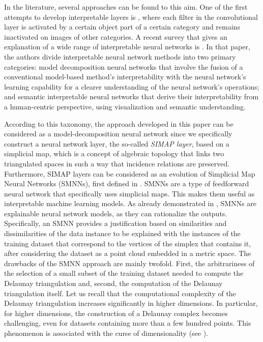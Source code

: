 In the literature, several approaches can be found to this aim.
One of the first attempts to develop interpretable layers is \cite{Zhang_2018_CVPR}, where each filter in the convolutional layer is activated by a certain object part of a certain category and remains inactivated on images of other categories. A recent survey that gives an explanation of a wide range of interpretable neural networks is
\cite{Liu2023InterpretableNN}.
In that paper, the authors divide interpretable neural network methods into two primary categories: model decomposition neural networks that involve the fusion of a conventional model-based method's interpretability with the neural network's learning capability for a clearer understanding of the neural network's operations; and semantic interpretable neural networks that derive their interpretability from a human-centric perspective, using visualization and semantic understanding.

According to this taxonomy, the approach developed in this paper can be considered as a model-decomposition neural network since we specifically construct a neural network layer, the so-called {\it SIMAP layer},  based on a simplicial map, which is a concept of algebraic topology that links two triangulated spaces in such a way that incidence relations are preserved.
Furthermore, SIMAP layers can be considered as an evolution of Simplicial Map Neural Networks (SMNNs), first defined in \cite{PaluzoHidalgo2020TwoHiddenLayerFF}.
SMNNs are a type of feedforward neural network that specifically uses
simplicial maps. This makes them useful as interpretable machine learning models.
As already demonstrated in \cite{PaluzoHidalgo2023ExplainabilitySM}, SMNNs are explainable neural network models, as they can rationalize the outputs. Specifically, an SMNN provides a justification based on similarities and dissimilarities of the data instance
to be explained with the instances of the training dataset that correspond
to the vertices of the simplex 
that contains it, after considering the dataset as a 
point cloud embedded in a metric space. The drawbacks of the SMNN approach are mainly twofold. First, the arbitrariness of the selection of a small subset of the training dataset needed to compute the Delaunay triangulation and, second, the computation of the Delaunay triangulation itself. Let us recall that the computational complexity of the Delaunay triangulation increases significantly in higher dimensions. 
In particular, for higher dimensions, the construction of a Delaunay complex becomes challenging, even for datasets containing more than a few hundred points.
This phenomenon is associated with the curse of dimensionality (see \cite{Chang2020DelaunayTriangulation}).

